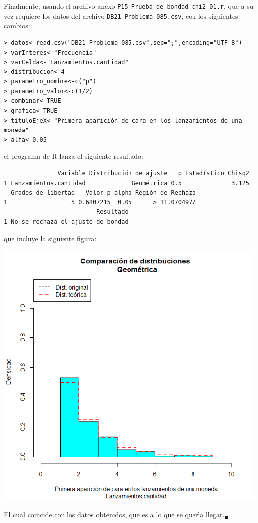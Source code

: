 \begin{solucion}
 Finalmente, usando el archivo anexo
 \texttt{P15\_Prueba\_de\_bondad\_chi2\_01.r},
 que a su vez requiere los datos del archivo
 \texttt{DB21\_Problema\_085.csv}, con los siguientes cambios:
 \begin{verbatim}
> datos<-read.csv("DB21_Problema_085.csv",sep=";",encoding="UTF-8")
> varInteres<-"Frecuencia"
> varCelda<-"Lanzamientos.cantidad"
> distribucion<-4
> parametro_nombre<-c("p")
> parametro_valor<-c(1/2)
> combinar<-TRUE
> grafica<-TRUE
> tituloEjeX<-"Primera aparición de cara en los lanzamientos de una moneda"
> alfa<-0.05
 \end{verbatim}
 \vspace{-0.7cm}
 el programa de R lanza el siguiente resultado:
 \begin{verbatim}
               Variable Distribución de ajuste   p Estadístico Chisq2
1 Lanzamientos.cantidad             Geométrica 0.5              3.125
  Grados de libertad   Valor-p alpha Región de Rechazo
1                  5 0.6807215  0.05      > 11.0704977
                          Resultado
1 No se rechaza el ajuste de bondad
 \end{verbatim}
 \vspace{-0.7cm}
 que incluye la siguiente figura:
 \begin{center}
  \includegraphics[scale=0.35]{Problema_85.png}
 \end{center}
 El cual coincide con los datos obtenidos,
 que es a lo que se quer\'{\i}a llegar.${}_{\blacksquare}$
\end{solucion}
